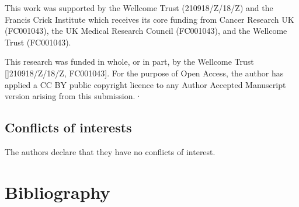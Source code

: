 This work was supported by the Wellcome Trust (210918/Z/18/Z) and the Francis Crick Institute which receives its core funding from Cancer Research UK (FC001043), the UK Medical Research Council (FC001043), and the Wellcome Trust (FC001043).

This research was funded in whole, or in part, by the Wellcome Trust []210918/Z/18/Z, FC001043]. For the purpose of Open Access, the author has applied a CC BY public copyright licence to any Author Accepted Manuscript version arising from this submission.·


\subsection*{Conflicts of interests}
The authors declare that they have no conflicts of interest.



\section*{Bibliography}



